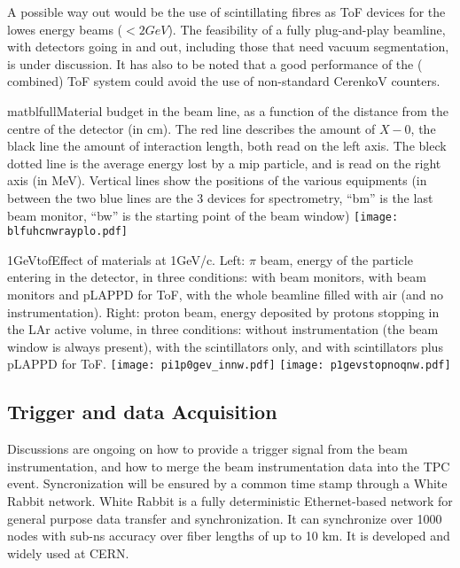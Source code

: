 A possible way out would be the use of scintillating fibres as ToF devices for the lowes energy beams ($< 2 GeV$).  The feasibility of a fully plug-and-play beamline, with detectors going in and out, including those that need vacuum segmentation, is under discussion. It has also to be noted that a good performance of the ( combined) ToF system could avoid the use of non-standard CerenkoV counters.
 \begin{cdrfigure}{matblfull}{Material budget in the beam line, as a function of the distance from the centre of the detector (in cm). The red line describes the amount of $X-0$, the black line the amount of interaction length, both read on the left axis. The bleck dotted line is the average energy lost by a mip particle, and is read on the right axis (in MeV). Vertical lines show the positions of the various equipments (in between the two blue lines are the 3 devices for spectrometry, ``bm'' is the last beam monitor, ``bw'' is the starting point of the beam window)}  
\texttt{[image: blfuhcnwrayplo.pdf]}
\end{cdrfigure}
 \begin{cdrfigure}{1GeVtof}{Effect of materials at  1GeV/c. Left: $\pi$ beam, energy of the particle entering in the detector, in three conditions: with  beam monitors, with beam monitors and pLAPPD for ToF, with the whole beamline filled with air (and no instrumentation). Right: proton beam, energy deposited by protons stopping in the LAr active volume, in three conditions: without instrumentation (the beam window is always present), with the scintillators only, and with scintillators plus pLAPPD for ToF.  }
\texttt{[image: pi1p0gev\_innw.pdf]}
\texttt{[image: p1gevstopnoqnw.pdf]}
\end{cdrfigure}
  

\subsection {Trigger and data Acquisition}
Discussions are ongoing on how to provide a trigger signal from the beam instrumentation, and how to merge the beam instrumentation data into the TPC event. Syncronization will be ensured by a common time stamp through a White Rabbit network. White Rabbit is a fully deterministic Ethernet-based network for general purpose data transfer and synchronization. It can synchronize over 1000 nodes with sub-ns accuracy over fiber lengths of up to 10 km. It is developed and widely used at CERN.
